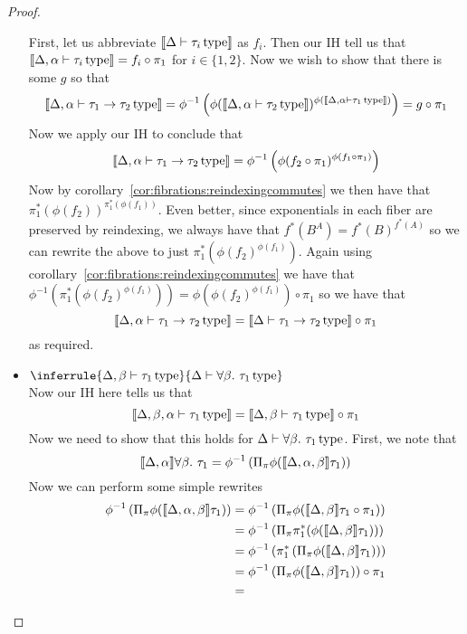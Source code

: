 \begin{proof}
\begin{itemize}
    First, let us abbreviate $\llbracket \Delta \vdash \tau_i\,\mathrm{type} \rrbracket$ as
    $f_i$. Then our IH tell us that
    $\llbracket \Delta, \alpha \vdash \tau_i\,\mathrm{type} \rrbracket = f_i \circ \pi_1$ for
    $i \in \{1, 2\}$. Now we wish to show that there is some $g$ so
    that
    \[
      \llbracket \Delta, \alpha \vdash \tau_1 \to \tau_2\,\mathrm{type} \rrbracket =
      \phi^{-1}\left(\phi(\llbracket \Delta, \alpha \vdash \tau_2\,\mathrm{type} \rrbracket)^{\phi(\llbracket \Delta, \alpha \vdash \tau_1\,\mathrm{type} \rrbracket)}\right) =
      g \circ \pi_1
    \]
    Now we apply our IH to conclude that
    \[
      \llbracket \Delta, \alpha \vdash \tau_1 \to \tau_2\,\mathrm{type} \rrbracket =
      \phi^{-1}\left(\phi(f_2 \circ \pi_1)^{\phi(f_1 \circ \pi_1)}\right)
    \]
    Now by corollary~\ref{cor:fibrations:reindexingcommutes} we then
    have that $\pi_1^*(\phi(f_2))^{\pi_1^*(\phi(f_1))}$. Even better,
    since exponentials in each fiber are preserved by reindexing, we
    always have that $f^*(B^A) = f^*(B)^{f^*(A)}$ so we can rewrite
    the above to just
    $\pi_1^*\left(\phi(f_2)^{\phi(f_1)}\right)$. Again using
    corollary~\ref{cor:fibrations:reindexingcommutes} we have that
    $\phi^{-1}(\pi_1^*(\phi(f_2)^{\phi(f_1)})) =
    \phi(\phi(f_2)^{\phi(f_1)}) \circ \pi_1$ so we have that
    \[
      \llbracket \Delta, \alpha \vdash \tau_1 \to \tau_2\,\mathrm{type} \rrbracket =
      \llbracket \Delta \vdash \tau_1 \to \tau_2\,\mathrm{type} \rrbracket \circ \pi_1
    \]
    as required.
  \item
    $\inferrule{
      \typeJ{\Delta, \beta}{\tau_1}
    }{\typeJ{\Delta}{\all{\beta}{\tau_1}}}$\\
    Now our IH here tells us that
    \[
      \llbracket \Delta, \beta, \alpha \vdash \tau_1\,\mathrm{type} \rrbracket =
      \llbracket \Delta, \beta \vdash \tau_1\,\mathrm{type} \rrbracket \circ \pi_1
    \]
    Now we need to show that this holds for
    $\Delta \vdash \forall \beta.\ \tau_1\,\mathrm{type}$. First, we note that
    \[
      \llbracket \Delta, \alpha \rrbracket{\ensuremath{\forall \beta.\ \tau_1}} =
      \phi^{-1}\left(\Pi_{\pi} \phi(\llbracket \Delta, \alpha, \beta \rrbracket{\tau_1})\right)
    \]
    Now we can perform some simple rewrites
    \begin{align*}
      \phi^{-1}\left(\Pi_{\pi} \phi(\denote{\Delta, \alpha, \beta}{\tau_1})\right) &=
      \phi^{-1}\left(\Pi_{\pi} \phi(\denote{\Delta, \beta}{\tau_1} \circ \pi_1)\right) \\&=
      \phi^{-1}\left(\Pi_{\pi} \pi_1^*(\phi(\denote{\Delta, \beta}{\tau_1}))\right) \\&=
      \phi^{-1}\left(\pi_1^*\left(\Pi_{\pi} \phi(\denote{\Delta, \beta}{\tau_1})\right)\right) \\&=
      \phi^{-1}\left(\Pi_{\pi} \phi(\denote{\Delta, \beta}{\tau_1})\right) \circ \pi_1\\&=

\end{align*}
\end{itemize}
\end{proof}
